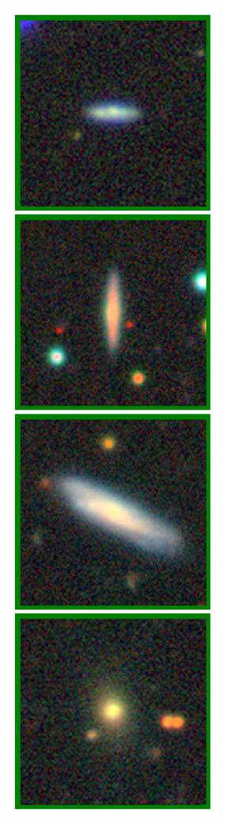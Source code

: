 \documentclass[draft, a4paper,12pt]{article}
\begin{document}
\begin{figure}[H]
    \centering
    \begin{subfigure}{0.08\textwidth}
        \centering
        \includegraphics[height=0.21\textheight]{../figures/query_images.png}

\end{subfigure}
\end{figure}
\end{document}
